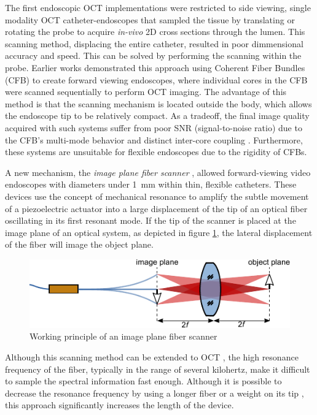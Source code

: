 \documentclass[10pt]{iopart}
\begin{document}
The first endoscopic OCT implementations were restricted to side viewing, single modality OCT catheter-endoscopes that sampled the tissue by translating \cite{Feldchtein1998} or rotating \cite{Tearney1994, Tearney1996} the probe to acquire \textit{in-vivo} 2D cross sections through the lumen. This scanning method, displacing the entire catheter, resulted in poor dimmensional accuracy and speed. This can be solved by performing the scanning within the probe. Earlier works demonstrated this approach using Coherent Fiber Bundles (CFB) to create forward viewing endoscopes, where individual cores in the CFB were scanned sequentially to perform OCT imaging. The advantage of this method is that the scanning mechanism is located outside the body, which allows the endoscope tip to be relatively compact. As a tradeoff, the final image quality acquired with such systems suffer from poor SNR (signal-to-noise ratio) due to the CFB’s multi-mode behavior and distinct inter-core coupling \cite{Xie2005}. Furthermore, these systems are unsuitable for flexible endoscopes due to the rigidity of CFBs.

A new mechanism, the \textit{image plane fiber scanner} \cite{Seibel2001}, allowed forward-viewing video endoscopes with diameters under \SI{1}{\milli\meter} within thin, flexible catheters. 
These devices use the concept of mechanical resonance to amplify the subtle movement of a piezoelectric actuator into a large displacement of the tip of an optical fiber oscillating in its first resonant mode. If the tip of the scanner is placed at the image plane of an optical system, as depicted in figure \ref{fig:fiberScanner}, the lateral displacement of the fiber will image the object plane. 
\begin{figure}[h!]\centering \includegraphics{figures/fiberScanner.pdf}
      \caption{Working principle of an image plane fiber scanner}
      \label{fig:fiberScanner}
\end{figure}

Although this scanning method can be extended to OCT \cite{Lurie2015}, the high resonance frequency of the fiber, typically in the range of several kilohertz, make it difficult to sample the spectral information fast enough. Although it is possible to decrease the resonance frequency by using a longer fiber or a weight on its tip \cite{Moon2010}, this approach significantly increases the length of the device. 
\end{document}
